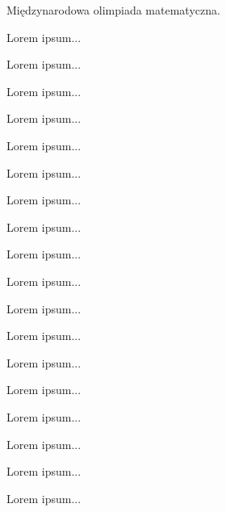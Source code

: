 Międzynarodowa olimpiada matematyczna.



\begin{exercise}[1/1960] Lorem ipsum... \end{exercise}
\begin{exercise}[2/1960] Lorem ipsum... \end{exercise}
\begin{exercise}[3/1960] Lorem ipsum... \end{exercise}
\begin{exercise}[4/1960] Lorem ipsum... \end{exercise}
\begin{exercise}[5/1960] Lorem ipsum... \end{exercise}
\begin{exercise}[6/1960] Lorem ipsum... \end{exercise}

\begin{exercise}[1/1961] Lorem ipsum... \end{exercise}
\begin{exercise}[2/1961] Lorem ipsum... \end{exercise}
\begin{exercise}[3/1961] Lorem ipsum... \end{exercise}
\begin{exercise}[4/1961] Lorem ipsum... \end{exercise}
\begin{exercise}[5/1961] Lorem ipsum... \end{exercise}
\begin{exercise}[6/1961] Lorem ipsum... \end{exercise}

\begin{exercise}[1/1962] Lorem ipsum... \end{exercise}
\begin{exercise}[2/1962] Lorem ipsum... \end{exercise}
\begin{exercise}[3/1962] Lorem ipsum... \end{exercise}
\begin{exercise}[4/1962] Lorem ipsum... \end{exercise}
\begin{exercise}[5/1962] Lorem ipsum... \end{exercise}
\begin{exercise}[6/1962] Lorem ipsum... \end{exercise}

